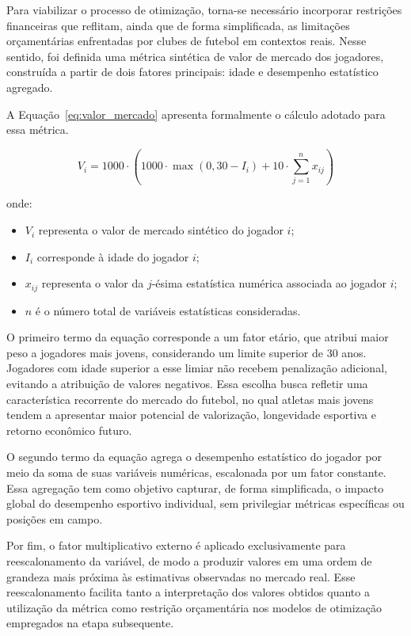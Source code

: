Para viabilizar o processo de otimização, torna-se necessário incorporar restrições financeiras que reflitam, ainda que de forma simplificada, 
as limitações orçamentárias enfrentadas por clubes de futebol em contextos reais. 
Nesse sentido, foi definida uma métrica sintética de valor de mercado dos jogadores, construída a partir de dois fatores principais: 
idade e desempenho estatístico agregado.

A Equação~\ref{eq:valor_mercado} apresenta formalmente o cálculo adotado para essa métrica.

\begin{equation}
\label{eq:valor_mercado}
V_i = 1000 \cdot \left( 1000 \cdot \max(0, 30 - I_i) + 10 \cdot \sum_{j=1}^{n} x_{ij} \right)
\end{equation}

onde:
\begin{itemize}
    \item $V_i$ representa o valor de mercado sintético do jogador $i$;
    \item $I_i$ corresponde à idade do jogador $i$;
    \item $x_{ij}$ representa o valor da $j$-ésima estatística numérica associada ao jogador $i$;
    \item $n$ é o número total de variáveis estatísticas consideradas.
\end{itemize}

O primeiro termo da equação corresponde a um fator etário, que atribui maior peso a jogadores mais jovens, considerando um limite superior de 30 anos. 
Jogadores com idade superior a esse limiar não recebem penalização adicional, evitando a atribuição de valores negativos. 
Essa escolha busca refletir uma característica recorrente do mercado do futebol, no qual atletas mais jovens tendem a apresentar maior potencial de valorização, 
longevidade esportiva e retorno econômico futuro.

O segundo termo da equação agrega o desempenho estatístico do jogador por meio da soma de suas variáveis numéricas, escalonada por um fator constante. 
Essa agregação tem como objetivo capturar, de forma simplificada, o impacto global do desempenho esportivo individual, 
sem privilegiar métricas específicas ou posições em campo.

Por fim, o fator multiplicativo externo é aplicado exclusivamente para reescalonamento da variável, de modo a produzir valores em uma ordem de grandeza 
mais próxima às estimativas observadas no mercado real. 
Esse reescalonamento facilita tanto a interpretação dos valores obtidos quanto a utilização da métrica como restrição orçamentária 
nos modelos de otimização empregados na etapa subsequente.

